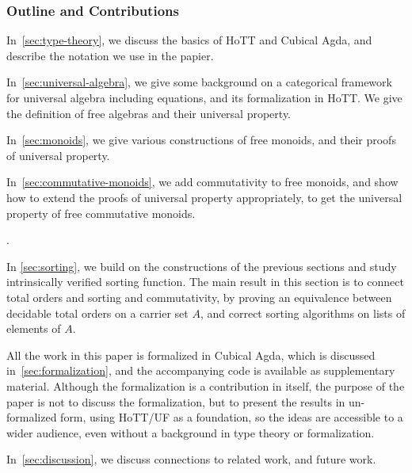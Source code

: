 


\subsubsection*{Outline and Contributions}

\begin{myitemize}
  \item In~\cref{sec:type-theory}, we discuss the basics of HoTT and Cubical Agda, and describe the notation we use in the papier.
  \item In~\cref{sec:universal-algebra}, we give some background on a categorical framework for universal algebra including equations, and its formalization in HoTT. We give the definition of free algebras and their universal property. 
  \item In~\cref{sec:monoids}, we give various constructions of free monoids, and their proofs of universal property.
  \item In~\cref{sec:commutative-monoids}, we add commutativity to free monoids, and show how to extend the proofs of universal property appropriately, to get the universal property of free commutative monoids.
  \item {}.
  \item In \cref{sec:sorting}, we build on the constructions of the previous sections and study intrinsically verified sorting function. The main result in this section is to connect total orders and sorting and commutativity, by proving an equivalence between decidable total orders on a carrier set $A$, and correct sorting algorithms on lists of elements of $A$.
  \item All the work in this paper is formalized in Cubical Agda, which is discussed in~\cref{sec:formalization}, and the accompanying code is available as supplementary material. Although the formalization is a contribution in itself, the purpose of the paper is not to discuss the formalization, but to present the results in un-formalized form, using HoTT/UF as a foundation, so the ideas are accessible to a wider audience, even without a background in type theory or formalization.
  \item In~\cref{sec:discussion}, we discuss connections to related work, and future work.
\end{myitemize}
